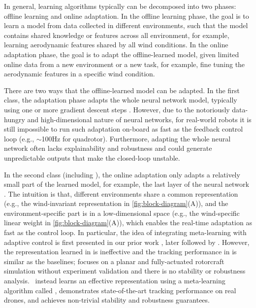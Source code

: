 In general, learning algorithms typically can be decomposed into two phases: offline learning and online adaptation. In the offline learning phase, the goal is to learn a model from data collected in different environments, such that the model contains shared knowledge or features across all environment, for example, learning aerodynamic features shared by all wind conditions. In the online adaptation phase, the goal is to adapt the offline-learned model, given limited online data from a new environment or a new task, for example, fine tuning the aerodynamic features in a specific wind condition.

There are two ways that the offline-learned model can be adapted. In the first class, the adaptation phase adapts the whole neural network model, typically using one or more gradient descent steps \cite{finn2017model,nagabandi2018learning,belkhale2021model,clavera2018model}. However, due to the notoriously data-hungry and high-dimensional nature of neural networks, for real-world robots it is still impossible to run such adaptation on-board as fast as the feedback control loop (e.g., $\sim$100Hz for quadrotor). Furthermore, adapting the whole neural network often lacks explainability and robustness and could generate unpredictable outputs that make the closed-loop unstable.

In the second class (including \nf), the online adaptation only adapts a relatively small part of the learned model, for example, the last layer of the neural network \cite{o2021meta,mckinnon2021meta,richards2021adaptive,peng2021linear}.
The intuition is that, different environments share a common representation (e.g., the wind-invariant representation in \cref{fig:block-diagram}(A)), and the environment-specific part is in a low-dimensional space (e.g., the wind-specific linear weight in \cref{fig:block-diagram}(A)), which enables the real-time adaptation as fast as the control loop. 
In particular, the idea of integrating meta-learning with adaptive control is first presented in our prior work \cite{o2021meta}, later followed by \cite{richards2021adaptive}. However, the representation learned in \cite{o2021meta} is ineffective and the tracking performance in \cite{o2021meta} is similar as the baselines; \cite{richards2021adaptive} focuses on a planar and fully-actuated rotorcraft simulation without experiment validation and there is no stability or robustness analysis. \nf~instead learns an effective representation using a  meta-learning algorithm called \DAML, demonstrates state-of-the-art tracking performance on real drones, and achieves non-trivial stability and robustness guarantees.

